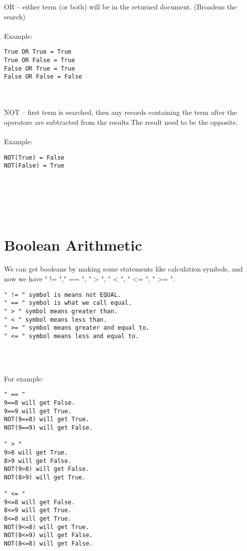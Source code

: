 OR -- either term (or both) will be in the returned document. (Broadens the search)\\ \ \\

\noindent Example:
\begin{verbatim}
True OR True = True
True OR False = True
False OR True = True
False OR False = False
\end{verbatim}\\ \ \\

NOT -- first term is searched, then any records containing the term after the operators are subtracted from the results.The result need to be the opposite.\\ \ \\

\noindent Example:
\begin{verbatim}
NOT(True) = False
NOT(False) = True
\end{verbatim}\\ \ \\
\ \\ \ \\ 

\section{Boolean Arithmetic}

We can get booleans by making some statements like calculation symbols, and now we have " != "," == ", " > ", " < ", " <= ", " >= ".\

\begin{framed}
\begin{verbatim}
" != " symbol is means not EQUAL.
" == " symbol is what we call equal.
" > " symbol means greater than.
" < " symbol means less than.
" >= " symbol means greater and equal to.
" <= " symbol means less and equal to.
\end{verbatim}\\ \ \\
\end{framed}

\noindent For example:
\begin{verbatim}
" == "
9==8 will get False.   
9==9 will get True.                
NOT(9==8) will get True.      
NOT(9==9) will get False.     

" > "
9>8 will get True.
8>9 will get False.
NOT(9>8) will get False.
NOT(8>9) will get True.

" <= "
9<=8 will get False.
8<=9 will get True.
8<=8 will get True.
NOT(9<=8) will get True.
NOT(8<=9) will get False.
NOT(8<=8) will get False.
\end{verbatim}


